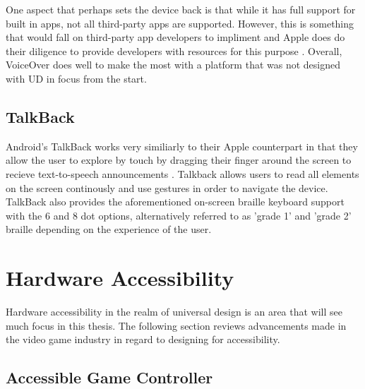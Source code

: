 One aspect that perhaps sets the device back is that while it has full support for built in apps, not all third-party apps are supported.
However, this is something that would fall on third-party app developers to impliment and Apple does do their diligence to provide developers with resources for this purpose \cite{iphonedev}.
Overall, VoiceOver does well to make the most with a platform that was not designed with UD in focus from the start.


\subsection{TalkBack}

Android's TalkBack works very similiarly to their Apple counterpart in that they allow the user to explore by touch by dragging their finger around the screen to recieve text-to-speech announcements \cite{android}.
Talkback allows users to read all elements on the screen continously and use gestures in order to navigate the device. %
TalkBack also provides the aforementioned on-screen braille keyboard support with the 6 and 8 dot options, alternatively referred to as 'grade 1' and 'grade 2' braille depending on the experience of the user.


\section{Hardware Accessibility}

Hardware accessibility in the realm of universal design is an area that will see much focus in this thesis. %
The following section reviews advancements made in the video game industry in regard to designing for accessibility.


\subsection{Accessible Game Controller}

